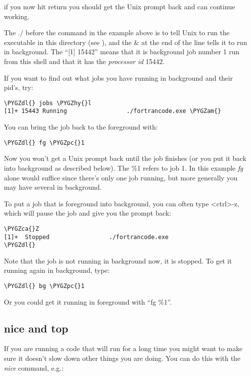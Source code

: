 \documentclass[letterpaper,10pt,english]{sphinxmanual}
\def\PYGZca{\char`\^}
\def\PYGZam{\char`\&}
\def\PYGZpc{\char`\%}
\def\PYGZdl{\char`\$}
\def\PYGZhy{\char`\-}
\begin{document}
if you now hit return you should get the Unix prompt back and can continue
working.

The ./ before the command in the example above is
to tell Unix to run the executable in this
directory (see ), and the \& at the end of the line tells it to
run in background.  The ``{[}1{]} 15442'' means that it is background job number 1
run from this shell and that it has the \emph{processor id} 15442.

If you want to find out what jobs you have running in background and their
pid's, try:

\begin{Verbatim}[commandchars=\\\{\}]
\PYGZdl{} jobs \PYGZhy{}l
[1]+ 15443 Running                 ./fortrancode.exe \PYGZam{}
\end{Verbatim}

You can bring the job back to the foreground with:

\begin{Verbatim}[commandchars=\\\{\}]
\PYGZdl{} fg \PYGZpc{}1
\end{Verbatim}

Now you won't get a Unix prompt back until the job finishes (or you put it
back into background as described below). The \%1 refers to job 1.  In this
example \emph{fg} alone would suffice since there's only one job running, but
more generally you may have several in background.

To put a job that is foreground into background, you can often type
\textless{}ctrl\textgreater{}-z, which will pause the job and give you the prompt back:

\begin{Verbatim}[commandchars=\\\{\}]
\PYGZca{}Z
[1]+  Stopped                 ./fortrancode.exe
\PYGZdl{}
\end{Verbatim}

Note that the job is not running in background now, it is stopped.  To get
it running again in background, type:

\begin{Verbatim}[commandchars=\\\{\}]
\PYGZdl{} bg \PYGZpc{}1
\end{Verbatim}

Or you could get it running in foreground with ``fg \%1''.


\subsection{nice and top}
\label{unix:nice-and-top}
If you are running a code that will run for a long time you might want to
make sure it doesn't slow down other things you are doing.  You can do this
with the \emph{nice} command, e.g.:
\end{document}
